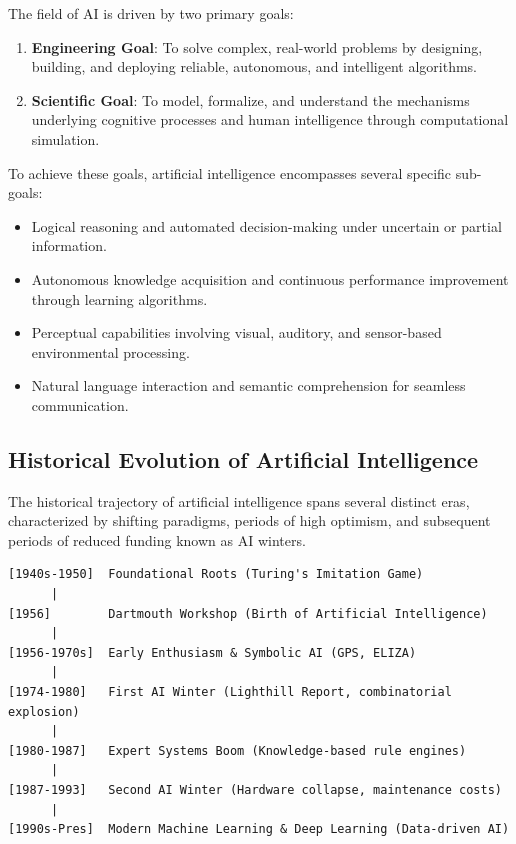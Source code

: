 \documentclass[12pt]{report}
\begin{document}
The field of AI is driven by two primary goals:
\begin{enumerate}
    \item \textbf{Engineering Goal}: To solve complex, real-world problems by designing, building, and deploying reliable, autonomous, and intelligent algorithms.
    \item \textbf{Scientific Goal}: To model, formalize, and understand the mechanisms underlying cognitive processes and human intelligence through computational simulation.
\end{enumerate}

To achieve these goals, artificial intelligence encompasses several specific sub-goals:
\begin{itemize}
    \item Logical reasoning and automated decision-making under uncertain or partial information.
    \item Autonomous knowledge acquisition and continuous performance improvement through learning algorithms.
    \item Perceptual capabilities involving visual, auditory, and sensor-based environmental processing.
    \item Natural language interaction and semantic comprehension for seamless communication.
\end{itemize}

\subsection{Historical Evolution of Artificial Intelligence}

The historical trajectory of artificial intelligence spans several distinct eras, characterized by shifting paradigms, periods of high optimism, and subsequent periods of reduced funding known as AI winters.

\begin{verbatim}
[1940s-1950]  Foundational Roots (Turing's Imitation Game)
      |
[1956]        Dartmouth Workshop (Birth of Artificial Intelligence)
      |
[1956-1970s]  Early Enthusiasm & Symbolic AI (GPS, ELIZA)
      |
[1974-1980]   First AI Winter (Lighthill Report, combinatorial explosion)
      |
[1980-1987]   Expert Systems Boom (Knowledge-based rule engines)
      |
[1987-1993]   Second AI Winter (Hardware collapse, maintenance costs)
      |
[1990s-Pres]  Modern Machine Learning & Deep Learning (Data-driven AI)
\end{verbatim}
\end{document}
